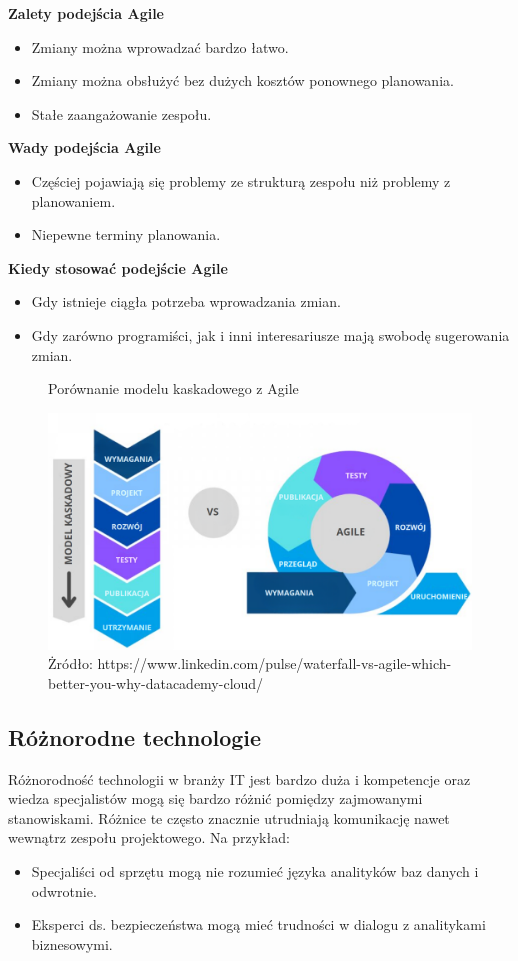\textbf{Zalety podejścia Agile}
\begin{itemize}
    \item Zmiany można wprowadzać bardzo łatwo.
    \item Zmiany można obsłużyć bez dużych kosztów ponownego planowania.
    \item Stałe zaangażowanie zespołu.
\end{itemize}

\textbf{Wady podejścia Agile}
\begin{itemize}
    \item Częściej pojawiają się problemy ze strukturą zespołu niż problemy z planowaniem.
    \item Niepewne terminy planowania.
\end{itemize}

\textbf{Kiedy stosować podejście Agile}
\begin{itemize}
    \item Gdy istnieje ciągła potrzeba wprowadzania zmian.
    \item Gdy zarówno programiści, jak i inni interesariusze mają swobodę sugerowania zmian. \autocite{arora2016analysis}
\end{itemize}

\begin{figure}
    \centering
    \caption{Porównanie modelu kaskadowego z Agile}
    \includegraphics[width=1\linewidth]{img/waterfall_agile_PL.png}
    \caption*{Żródło: https://www.linkedin.com/pulse/waterfall-vs-agile-which-better-you-why-datacademy-cloud/}
\end{figure}

\subsection{Różnorodne technologie}
Różnorodność technologii w branży IT jest bardzo duża i kompetencje oraz wiedza specjalistów mogą się bardzo różnić pomiędzy zajmowanymi stanowiskami. 
Różnice te często znacznie utrudniają komunikację nawet wewnątrz zespołu projektowego. Na przykład:
\begin{itemize}
    \item Specjaliści od sprzętu mogą nie rozumieć języka analityków baz danych i odwrotnie.
    \item Eksperci ds. bezpieczeństwa mogą mieć trudności w dialogu z analitykami biznesowymi.
\end{itemize}

